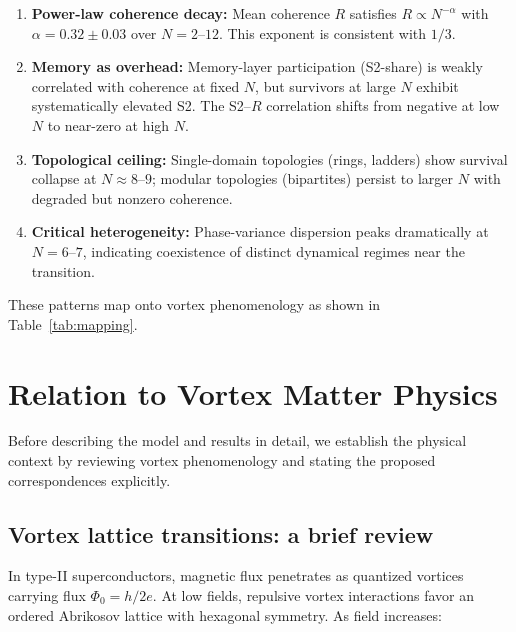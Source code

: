 \documentclass[reprint,aps,prb,superscriptaddress,floatfix]{revtex4-2}
\begin{document}
\begin{enumerate}
\item \textbf{Power-law coherence decay:} Mean coherence $R$ satisfies $R \propto N^{-\alpha}$ with $\alpha = 0.32 \pm 0.03$ over $N = 2$--$12$. This exponent is consistent with $1/3$.

\item \textbf{Memory as overhead:} Memory-layer participation (S2-share) is weakly correlated with coherence at fixed $N$, but survivors at large $N$ exhibit systematically elevated S2. The S2--$R$ correlation shifts from negative at low $N$ to near-zero at high $N$.

\item \textbf{Topological ceiling:} Single-domain topologies (rings, ladders) show survival collapse at $N \approx 8$--$9$; modular topologies (bipartites) persist to larger $N$ with degraded but nonzero coherence.

\item \textbf{Critical heterogeneity:} Phase-variance dispersion peaks dramatically at $N = 6$--$7$, indicating coexistence of distinct dynamical regimes near the transition.
\end{enumerate}

These patterns map onto vortex phenomenology as shown in Table~\ref{tab:mapping}.

\section{Relation to Vortex Matter Physics}

Before describing the model and results in detail, we establish the physical context by reviewing vortex phenomenology and stating the proposed correspondences explicitly.

\subsection{Vortex lattice transitions: a brief review}

In type-II superconductors, magnetic flux penetrates as quantized vortices carrying flux $\Phi_0 = h/2e$. At low fields, repulsive vortex interactions favor an ordered Abrikosov lattice with hexagonal symmetry. As field increases:
\end{document}
